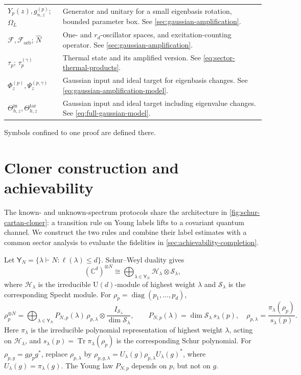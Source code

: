 \documentclass[11pt]{article}
\theoremstyle{remark}
\theoremstyle{plain}
\newcommand{\C}{\mathbb C}
\newcommand{\cF}{\mathcal F}
\newcommand{\cH}{\mathcal H}
\newcommand{\cS}{\mathcal S}
\newcommand{\U}{\mathrm U}
\newcommand{\diag}{\operatorname{diag}}
\newcommand{\Tr}{\operatorname{Tr}}
\newcommand{\ot}{\otimes}
\begin{document}
\begin{longtable}{@{}>{\raggedright\arraybackslash}p{.28\linewidth}>{\raggedright\arraybackslash}p{}@{}}
\(Y_p(z),g_{n,z}^{(p)}\); \(\Omega_L\)
& Generator and unitary for a small eigenbasis rotation, bounded parameter
  box.  See
  \cref{sec:gaussian-amplification}. \\[3pt]
\(\cF,\cF_{\mathrm{orb}}\); \(\widehat N\)
& One- and \(r_d\)-oscillator spaces, and excitation-counting operator. See
  \cref{sec:gaussian-amplification}. \\[3pt]
\(\tau_p\); \(\tau_p^{(\gamma)}\)
& Thermal state and its amplified version. See
  \eqref{eq:sector-thermal-products}. \\[3pt]
\(\Phi_z^{(p)},\Psi_z^{(p,\gamma)}\)
& Gaussian input and ideal target for eigenbasis changes. See
  \eqref{eq:gaussian-amplification-model}. \\[3pt]
\(\Theta_{h,z}^{\mathrm{in}},\Theta_{h,z}^{\mathrm{tar}}\)
& Gaussian input and ideal target including eigenvalue changes. See
  \eqref{eq:full-gaussian-model}.
\end{longtable}
\endgroup
Symbols confined to one proof are defined there.


\section{Cloner construction and achievability}\label{sec:achievability}

The known- and unknown-spectrum protocols share the architecture in
\cref{fig:schur-cartan-cloner}: a transition rule on Young labels lifts to a
covariant quantum channel.  We construct the two rules and combine their
label estimates with a common sector analysis to evaluate the fidelities
in \cref{sec:achievability-completion}.

Let $\mathsf Y_N=\{\lambda\vdash N:\ell(\lambda)\le d\}$.  Schur--Weyl duality gives
\begin{equation}\label{eq:schur-weyl-decomposition}
  (\C^d)^{\ot N}
  \cong
  \bigoplus_{\lambda\in\mathsf Y_N}\cH_\lambda\ot\cS_\lambda,
\end{equation}
where \(\cH_\lambda\) is the irreducible \(\U(d)\)-module of highest
weight \(\lambda\) and \(\cS_\lambda\) is the corresponding Specht module.
For \(\rho_p=\diag(p_1,\ldots,p_d)\),
\begin{equation}\label{eq:schur-state}
  \rho_p^{\ot N}
  =\bigoplus_{\lambda\in\mathsf Y_N}
  P_{N,p}(\lambda)\,
  \rho_{p,\lambda}\ot\frac{I_{\cS_\lambda}}{\dim\cS_\lambda},
  \qquad
  P_{N,p}(\lambda)=\dim\cS_\lambda\,s_\lambda(p),
  \quad
  \rho_{p,\lambda}=\frac{\pi_\lambda(\rho_p)}{s_\lambda(p)}.
\end{equation}
Here \(\pi_\lambda\) is the irreducible polynomial representation of highest
weight \(\lambda\), acting on \(\cH_\lambda\), and
\(s_\lambda(p)=\Tr\pi_\lambda(\rho_p)\) is the corresponding Schur
polynomial.  For \(\rho_{p,g}=g\rho_p g^*\), replace \(\rho_{p,\lambda}\) by
\(\rho_{p,g,\lambda}=U_\lambda(g)\rho_{p,\lambda}U_\lambda(g)^*\), where
\(U_\lambda(g)=\pi_\lambda(g)\).  The
Young law \(P_{N,p}\) depends on \(p\), but not on \(g\).
\end{document}
